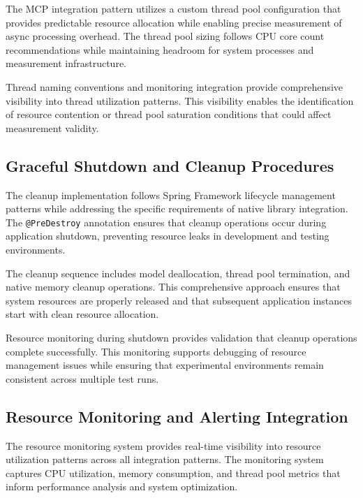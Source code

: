 
The MCP integration pattern utilizes a custom thread pool configuration that provides predictable resource allocation while enabling precise measurement of async processing overhead. The thread pool sizing follows CPU core count recommendations while maintaining headroom for system processes and measurement infrastructure.

Thread naming conventions and monitoring integration provide comprehensive visibility into thread utilization patterns. This visibility enables the identification of resource contention or thread pool saturation conditions that could affect measurement validity.

\subsection{Graceful Shutdown and Cleanup Procedures}

The cleanup implementation follows Spring Framework lifecycle management patterns while addressing the specific requirements of native library integration. The \texttt{@PreDestroy} annotation ensures that cleanup operations occur during application shutdown, preventing resource leaks in development and testing environments.


The cleanup sequence includes model deallocation, thread pool termination, and native memory cleanup operations. This comprehensive approach ensures that system resources are properly released and that subsequent application instances start with clean resource allocation.

Resource monitoring during shutdown provides validation that cleanup operations complete successfully. This monitoring supports debugging of resource management issues while ensuring that experimental environments remain consistent across multiple test runs.

\subsection{Resource Monitoring and Alerting Integration}

The resource monitoring system provides real-time visibility into resource utilization patterns across all integration patterns. The monitoring system captures CPU utilization, memory consumption, and thread pool metrics that inform performance analysis and system optimization.

